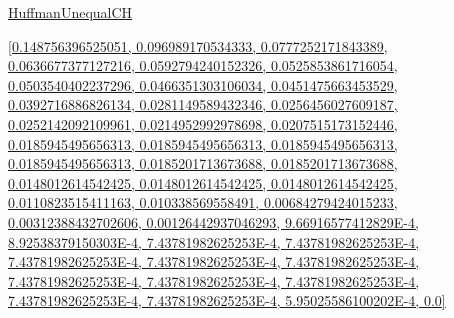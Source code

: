 \documentclass[12pt]{article}
\begin{document}
\noindent \url{HuffmanUnequalCH}

\noindent \url{[0.148756396525051, 0.096989170534333, 0.0777252171843389, 0.0636677377127216, 0.0592794240152326, 0.0525853861716054, 0.0503540402237296, 0.0466351303106034, 0.0451475663453529, 0.0392716886826134, 0.0281149589432346, 0.0256456027609187, 0.0252142092109961, 0.0214952992978698, 0.0207515173152446, 0.0185945495656313, 0.0185945495656313, 0.0185945495656313, 0.0185945495656313, 0.0185201713673688, 0.0185201713673688, 0.0148012614542425, 0.0148012614542425, 0.0148012614542425, 0.0110823515411163, 0.010338569558491, 0.00684279424015233, 0.00312388432702606, 0.00126442937046293, 9.66916577412829E-4, 8.92538379150303E-4, 7.43781982625253E-4, 7.43781982625253E-4, 7.43781982625253E-4, 7.43781982625253E-4, 7.43781982625253E-4, 7.43781982625253E-4, 7.43781982625253E-4, 7.43781982625253E-4, 7.43781982625253E-4, 7.43781982625253E-4, 5.95025586100202E-4, 0.0]}
\end{document}
